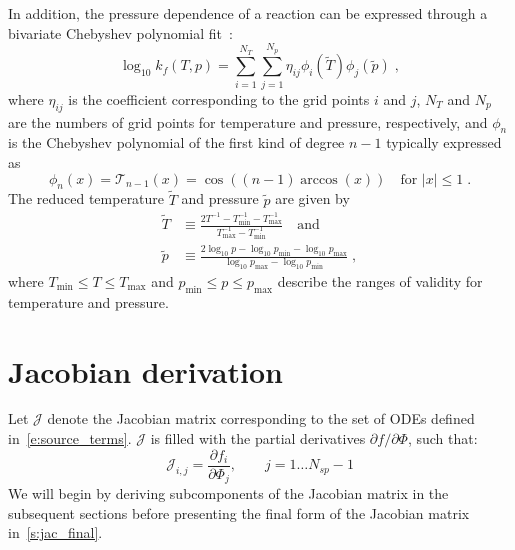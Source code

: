 \documentclass[12pt]{article}
\newcommand{\ns}{\ensuremath{{N_{sp}}}}
\begin{document}
In addition, the pressure dependence of a reaction can be expressed through a bivariate Chebyshev polynomial fit~\cite{Venkatesh:1997hv,Venkatesh:1997ik,Venkatesh:2000gj,chemkin:2012,Goodwin:2015aa}:
\begin{equation}
\log_{10} k_f (T, p) = \sum_{i = 1}^{N_T} \sum_{j = 1}^{N_p} \eta_{ij} \phi_i (\tilde{T}) \phi_j \left(\tilde{p}\right) \label{e:cheb} \;,
\end{equation}
where $\eta_{ij}$ is the coefficient corresponding to the grid points $i$ and $j$, $N_T$ and $N_p$ are the numbers of grid points for temperature and pressure, respectively, and $\phi_n$ is the Chebyshev polynomial of the first kind of degree $n - 1$ typically expressed as
\begin{equation}
\phi_n (x) = \mathcal{T}_{n-1} (x) = \cos \left( (n - 1) \arccos (x) \right) \quad \text{for } |x| \leq 1 \;.
\end{equation}
The reduced temperature $\tilde{T}$ and pressure $\tilde{p}$ are given by
\begin{align}
\tilde{T} &\equiv \frac{2 T^{-1} - T^{-1}_{\min} - T^{-1}_{\max}}{T^{-1}_{\max} - T^{-1}_{\min}} \quad\text{and} \\
\tilde{p} &\equiv \frac{2\log_{10} p - \log_{10} p_{\min} - \log_{10} p_{\max}}{\log_{10} p_{\max} - \log_{10} p_{\min}} \;,
\end{align}
where $T_{\min} \leq T \leq T_{\max}$ and $p_{\min} \leq p \leq p_{\max}$ describe the ranges of validity for temperature and pressure.

\section{Jacobian derivation}

Let $\mathcal{J}$ denote the Jacobian matrix corresponding to the set of ODEs defined in~\cref{e:source_terms}.
$\mathcal{J}$ is filled with the partial derivatives $\partial f / \partial \Phi$, such that:
\begin{equation}
 \mathcal{J}_{i,j} = \frac{\partial f_i}{\partial \Phi_j},\qquad j=1 \ldots \ns - 1
\end{equation}
We will begin by deriving subcomponents of the Jacobian matrix in the subsequent sections before presenting the final form of the Jacobian matrix in~\cref{s:jac_final}.
\end{document}
